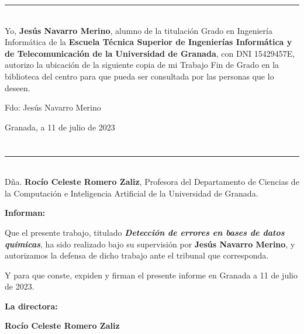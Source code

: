 \noindent\rule[-1ex]{\textwidth}{2pt}\\[4.5ex]

Yo, \textbf{Jesús Navarro Merino}, alumno de la titulación Grado en Ingeniería Informática de la \textbf{Escuela Técnica Superior
de Ingenierías Informática y de Telecomunicación de la Universidad de Granada}, con DNI 15429457E, autorizo la
ubicación de la siguiente copia de mi Trabajo Fin de Grado en la biblioteca del centro para que pueda ser
consultada por las personas que lo deseen.

\vspace{6cm}

\noindent Fdo: Jesús Navarro Merino

\vspace{2cm}

\begin{flushright}
Granada, a 11 de julio de 2023
\end{flushright}


\chapter*{}
\thispagestyle{empty}

\noindent\rule[-1ex]{\textwidth}{2pt}\\[4.5ex]

Dña. \textbf{Rocío Celeste Romero Zaliz}, Profesora del Departamento de Ciencias de la Computación e Inteligencia Artificial de la Universidad de Granada.


\vspace{0.5cm}

\textbf{Informan:}

\vspace{0.5cm}

Que el presente trabajo, titulado \textit{\textbf{Detección de errores en bases de datos químicas}},
ha sido realizado bajo su supervisión por \textbf{Jesús Navarro Merino}, y autorizamos la defensa de dicho trabajo ante el tribunal que corresponda.

\vspace{0.5cm}

Y para que conste, expiden y firman el presente informe en Granada a 11 de julio de 2023.

\vspace{1cm}

\textbf{La directora:}

\vspace{5cm}

\noindent \textbf{Rocío Celeste Romero Zaliz}

